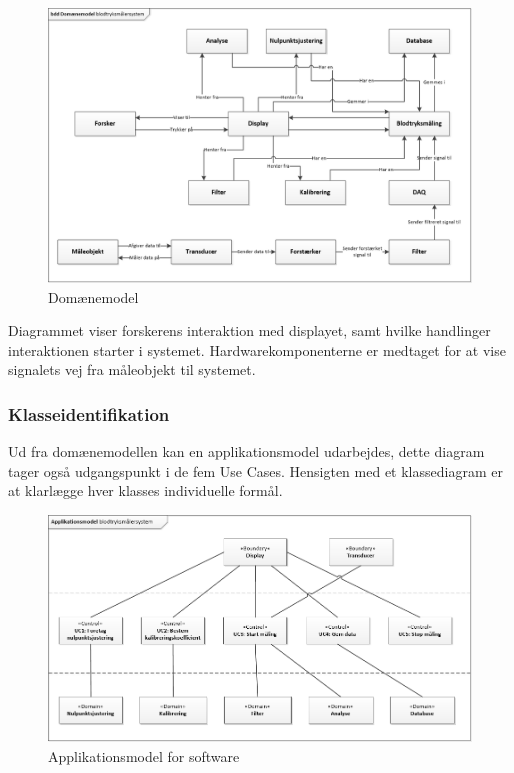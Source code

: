 \begin{figure}[H]
	\centering
	\includegraphics[width=1.0\textwidth]{Figurer/DomaneModel}
	\caption{Domænemodel}
	\label{fig:Domaenemodel}
\end{figure}
Diagrammet viser forskerens interaktion med displayet, samt hvilke handlinger interaktionen starter i systemet. Hardwarekomponenterne er medtaget for at vise signalets vej fra måleobjekt til systemet. 

\subsubsection{Klasseidentifikation}
Ud fra domænemodellen kan en applikationsmodel udarbejdes, dette diagram tager også udgangspunkt i de fem Use Cases. Hensigten med et klassediagram er at klarlægge hver klasses individuelle formål. 

\begin{figure}[H]
	\centering
	\includegraphics[width=1.0\textwidth]{Figurer/Applikationsmodel}
	\caption{Applikationsmodel for software}
	\label{fig:Applikationsmodellen}
\end{figure}

